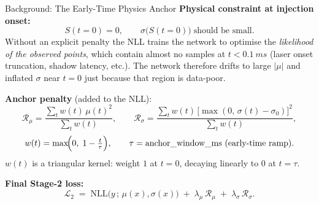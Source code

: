 \documentclass[UTF8,aspectratio=169]{ctexbeamer}
\begin{document}
\begin{frame}{Background: The Early-Time Physics Anchor}
\small
\textbf{Physical constraint at injection onset:}
\[
  S(t{=}0) = 0,\qquad \sigma\bigl(S(t{=}0)\bigr) \;\text{should be small.}
\]
Without an explicit penalty the NLL trains the network to optimise the \emph{likelihood of the
observed points}, which contain almost no samples at $t < \SI{0.1}{ms}$ (laser onset truncation,
shadow latency, etc.). The network therefore drifts to large $|\mu|$ and inflated $\sigma$
near $t{=}0$ just because that region is data-poor.

\vspace{0.5em}
\textbf{Anchor penalty} (added to the NLL):
\[
  \mathcal{R}_{\mu} = \frac{\sum_t w(t)\,\mu(t)^2}{\sum_t w(t)},\qquad
  \mathcal{R}_{\sigma} = \frac{\sum_t w(t)\,\bigl[\max(0,\,\sigma(t)-\sigma_0)\bigr]^2}{\sum_t w(t)},
\]
\[
  w(t) = \max\!\Bigl(0,\;1 - \tfrac{t}{\tau}\Bigr),\qquad
  \tau = \text{anchor\_window\_ms (early-time ramp)}.
\]
$w(t)$ is a triangular kernel: weight $1$ at $t{=}0$, decaying linearly to $0$ at $t{=}\tau$.

\vspace{0.5em}
\textbf{Final Stage-2 loss:}
\[
  \mathcal{L}_2 \;=\; \mathrm{NLL}\bigl(y\,;\,\mu(x),\sigma(x)\bigr)
              \;+\; \lambda_\mu\,\mathcal{R}_\mu
              \;+\; \lambda_\sigma\,\mathcal{R}_\sigma.
\]
\end{frame}
\end{document}
